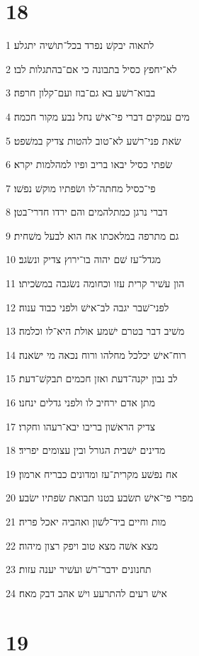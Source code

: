 \chapter{18}

\par 1 לתאוה יבקשׁ נפרד בכל־תושׁיה יתגלע׃
\par 2 לא־יחפץ כסיל בתבונה כי אם־בהתגלות לבו׃
\par 3 בבוא־רשׁע בא גם־בוז ועם־קלון חרפה׃
\par 4 מים עמקים דברי פי־אישׁ נחל נבע מקור חכמה׃
\par 5 שׂאת פני־רשׁע לא־טוב להטות צדיק במשׁפט׃
\par 6 שׂפתי כסיל יבאו בריב ופיו למהלמות יקרא׃
\par 7 פי־כסיל מחתה־לו ושׂפתיו מוקשׁ נפשׁו׃
\par 8 דברי נרגן כמתלהמים והם ירדו חדרי־בטן׃
\par 9 גם מתרפה במלאכתו אח הוא לבעל משׁחית׃
\par 10 מגדל־עז שׁם יהוה בו־ירוץ צדיק ונשׂגב׃
\par 11 הון עשׁיר קרית עזו וכחומה נשׂגבה במשׂכיתו׃
\par 12 לפני־שׁבר יגבה לב־אישׁ ולפני כבוד ענוה׃
\par 13 משׁיב דבר בטרם ישׁמע אולת היא־לו וכלמה׃
\par 14 רוח־אישׁ יכלכל מחלהו ורוח נכאה מי ישׂאנה׃
\par 15 לב נבון יקנה־דעת ואזן חכמים תבקשׁ־דעת׃
\par 16 מתן אדם ירחיב לו ולפני גדלים ינחנו׃
\par 17 צדיק הראשׁון בריבו יבא־רעהו וחקרו׃
\par 18 מדינים ישׁבית הגורל ובין עצומים יפריד׃
\par 19 אח נפשׁע מקרית־עז ומדונים כבריח ארמון׃
\par 20 מפרי פי־אישׁ תשׂבע בטנו תבואת שׂפתיו ישׂבע׃
\par 21 מות וחיים ביד־לשׁון ואהביה יאכל פריה׃
\par 22 מצא אשׁה מצא טוב ויפק רצון מיהוה׃
\par 23 תחנונים ידבר־רשׁ ועשׁיר יענה עזות׃
\par 24 אישׁ רעים להתרעע וישׁ אהב דבק מאח׃

\chapter{19}

